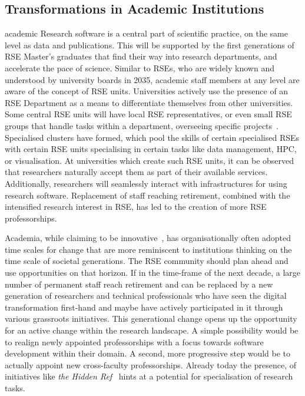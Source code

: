 \documentclass{eceasst}
\begin{document}
\subsection{Transformations in Academic Institutions}
\begin{whatis}{}{academic}
Research software is a central part of scientific practice, on the same level as data and publications.
This will be supported by the first generations of RSE Master's graduates that find their way into research departments, and accelerate the pace of science.
Similar to RSEs, who are widely known and understood by university boards in 2035, academic staff members at any level are aware of the concept of RSE units.
Universities actively use the presence of an RSE Department as a means to differentiate themselves from other universities.
Some central RSE units will have local RSE representatives, or even small RSE groups that handle tasks within a department, overseeing specific projects~\cite{Kempf2025-draft}.
Specialised clusters have formed, which pool the skills of certain specialised RSEs with certain RSE units specialising in certain tasks like data management, HPC, or visualisation.
At universities which create such RSE units, it can be observed that researchers naturally accept them as part of their available services.
Additionally, researchers will seamlessly interact with infrastructures for using research software.
Replacement of staff reaching retirement, combined with the intensified research interest in RSE, has led to the creation of more RSE professorships.
\end{whatis}
Academia, while claiming to be innovative~\cite{wzvgbayern},
has organisationally often adopted time scales for change that are more reminiscent
to institutions thinking on the time scale of societal generations.
The RSE community should plan ahead and use opportunities on that horizon.
If in the time-frame of the next decade, a large number of permanent staff reach retirement and
can be replaced by a new generation of researchers and technical professionals who have seen the
digital transformation first-hand and maybe have actively participated in it through various grassroots initiatives.
This generational change opens up the opportunity for an active change within the research landscape.
A simple possibility would be to realign newly appointed professorships with a focus towards software development within their domain.
A second, more progressive step would be to actually appoint new cross-faculty professorships.
Already today the presence, of initiatives like \emph{the Hidden Ref}~\cite{hiddenref} hints at a potential for specialisation of research tasks.
\end{document}
